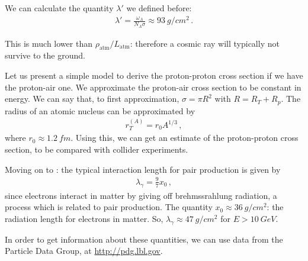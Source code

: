 \documentclass[main.tex]{subfiles}
\begin{document}
We can calculate the quantity \(\lambda'\) we defined before: 
%
\begin{align}
\lambda' = \frac{\omega_{A}}{ N_A \sigma } \approx \SI{93}{g / cm^2}
\,.
\end{align}

This is much lower than \(\rho _{\text{atm}} / L _{\text{atm}}\): therefore a cosmic ray will typically not survive to the ground. 

Let us present a simple model to derive the proton-proton cross section if we have the proton-air one. 
We approximate the proton-air cross section to be constant in energy. 
We can say that, to first approximation, \(\sigma = \pi R^2\) with \(R = R_T + R_p\).
The radius of an atomic nucleus can be approximated by 
%
\begin{align}
r_T^{(A)} = r_0 A^{1/3} 
\,,
\end{align}
%
where \(r_0 \approx \SI{1.2}{fm}\). 
Using this, we can get an estimate of the proton-proton cross section, to be compared with collider experiments. 

Moving on to : the typical interaction length for pair production is given by 
%
\begin{align}
\lambda_{\gamma  } = \frac{9}{7} x_0 
\,,
\end{align}
%
since electrons interact in matter by giving off brehmssrahlung radiation, a process which is related to pair production. 
The quantity \(x_0 \approx \SI{36}{g/ cm^2}\): the radiation length for electrons in matter. So, \(\lambda_{\gamma } \approx \SI{47}{g/cm^2 }\) for \(E > \SI{10}{GeV}\).

In order to get information about these quantities, we can use data from the Particle Data Group, at \url{http://pdg.lbl.gov}.
\end{document}
